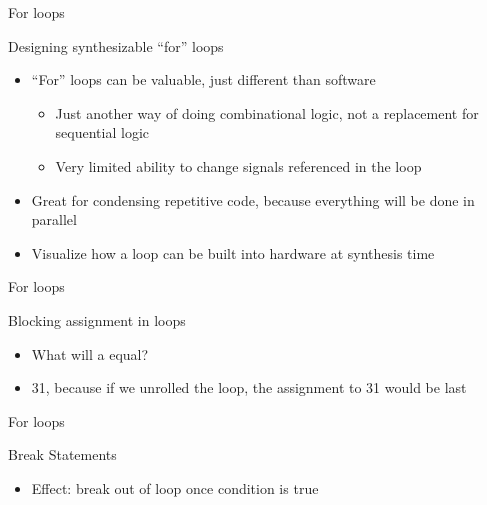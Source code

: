 \documentclass[table,dvipsnames]{beamer}
\begin{document}
 
     \begin{frame}[fragile]{For loops}
	\begin{block}{Designing synthesizable ``for'' loops}
		\begin{itemize}
			\item ``For'' loops can be valuable, just different than software
			\begin{itemize}
				\item Just another way of doing combinational logic, not a replacement for sequential logic
				\item Very limited ability to change signals referenced in the loop
			\end{itemize}
			\item Great for condensing repetitive code, because everything will be done in parallel
			\item Visualize how a loop can be built into hardware at synthesis time 

		\end{itemize}
	\end{block}
\end{frame}



     \begin{frame}[fragile]{For loops}
	\begin{block}{Blocking assignment in loops}
		\begin{itemize}
			 \begin{verbatim}
always_comb begin
	for (int i=0; i<32; i++)
		a = i;
end
			\end{verbatim}
			\item What will a equal?
			\item 31, because if we unrolled the loop, the assignment to 31 would be last
		\end{itemize}
	\end{block}
\end{frame}



     \begin{frame}[fragile]{For loops}
	\begin{block}{Break Statements}
		\begin{itemize}
			 \begin{verbatim}
always_comb begin
	for (int i=0; i<32; i++)
		a = i;
		if (condition[i]) break;
end
			\end{verbatim}
			\item Effect: break out of loop once condition is true
					\end{itemize}
	\end{block}
\end{frame}
\end{document}
